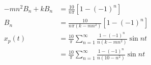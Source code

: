 \documentclass{article}
\begin{document}
\begin{align*}
  -m n^2 B_n + k B_n & = \frac{10}{n \pi} [1 - (-1)^n]                                                \\
  B_n                & = \frac{10}{n \pi (k - m n^2)} [1 - (-1)^n]                                    \\
  x_p(t)             & = \frac{10}{\pi} \sum_{n = 1}^\infty \frac{1 - (-1)^n}{n (k - m n^2)} \sin n t \\
                     & = \frac{10}{\pi} \sum_{n = 1}^\infty \frac{1 - (-1)^n}{n (10 - n^2)} \sin n t
\end{align*}

\setcounter{subsubsection}{44}
\subsubsection{}

\end{document}
